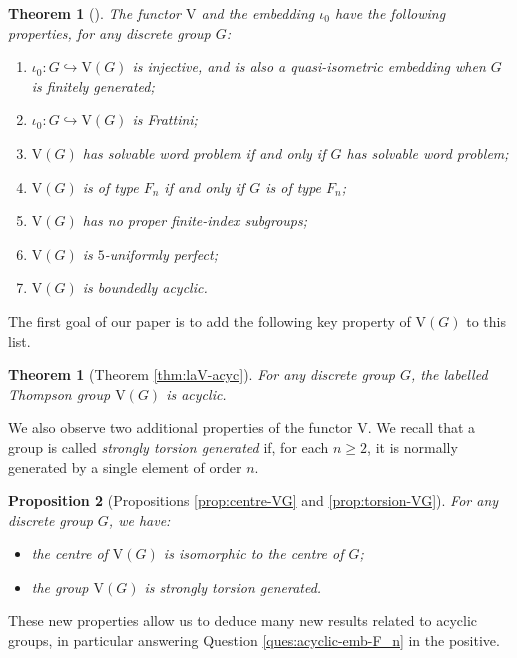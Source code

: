 \documentclass[10pt,a4paper]{amsart}
\numberwithin{equation}{section}
\numberwithin{figure}{section}
\newtheorem{athm}{Theorem}
\newtheorem{aprop}[athm]{Proposition}
\newtheorem*{thm*}{Theorem}
\theoremstyle{definition}
\newcommand{\V}{\mathrm{V}}
\renewcommand{\geq}{\geqslant}
\begin{document}
\begin{thm*}[\cite{Thompson80, WuWuZhaoZhou2025}]
\label{thm:labelled-V}
The functor $\V$ and the embedding $\iota_0$ have the following properties, for any discrete group $G$:
    \begin{enumerate}
        \item $\iota_0 \colon G \hookrightarrow \V(G)$ is injective, and is also a quasi-isometric embedding when $G$ is finitely generated;
        \item $\iota_0 \colon G \hookrightarrow \V(G)$ is Frattini;
        \item $\V(G)$ has solvable word problem if and only if $G$ has solvable word problem;
        \item $\V(G)$ is of type $F_n$ if and only if $G$ is of type $F_n$;
        \item $\V(G)$ has no proper finite-index subgroups;
        \item $\V(G)$ is $5$-uniformly perfect;
        \item $\V(G)$ is boundedly acyclic.
    \end{enumerate}
\end{thm*}

The first goal of our paper is to add the following key property of $\V(G)$ to this list.

\begin{athm}[Theorem \ref{thm:laV-acyc}]
\label{thm:VG}
For any discrete group $G$, the labelled Thompson group $\V(G)$ is acyclic.
\end{athm}

We also observe two additional properties of the functor $\V$. We recall that a group is called \emph{strongly torsion generated} if, for each $n\geq 2$, it is normally generated by a single element of order $n$.

\begin{aprop}[Propositions \ref{prop:centre-VG} and \ref{prop:torsion-VG}]
\label{aprop:VG-centre}
For any discrete group $G$, we have:
\begin{itemize}
    \item the centre of $\V(G)$ is isomorphic to the centre of $G$;
    \item the group $\V(G)$ is strongly torsion generated.
\end{itemize}
\end{aprop}

These new properties allow us to deduce many new results related to acyclic groups, in particular answering Question \ref{ques:acyclic-emb-F_n} in the positive.
\end{document}
